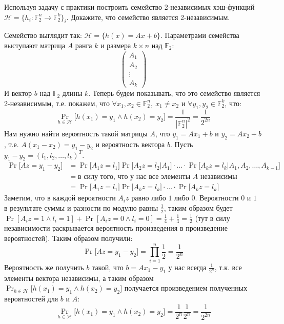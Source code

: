 \begin{task}[3]
Используя задачу с практики построить семейство 2-независимых хэш-функций $\mathcal{H} = \{ h_i: \mathbb{F}_2^n \rightarrow \mathbb{F}^k_2\}_i$. Докажите, что семейство является 2-независимым.
\end{task}
\begin{solution}
Семейство выглядит так: $\mathcal{H} = \{ h(x) = Ax + b \}$. Параметрами семейства выступают матрица $A$ ранга $k$ и размера $k \times n$  над $\mathbb{F}_2$: 
\[
	\begin{pmatrix}
		A_1 \\
		A_2 \\
		\vdots\\
		A_k
	\end{pmatrix}
\]
И вектор $b$ над $\mathbb{F}_2$ длины $k$. Теперь будем показывать, что это семейство является 2-независимым, т.е. покажем, что $\forall x_1, x_2 \in \mathbb{F}_2^n,\ x_1 \neq x_2$ и $\forall y_1, y_2 \in \mathbb{F}_2^k$, что:
\[
	\Pr_{h \in \mathcal{H}}\big[ h(x_1) = y_1 \wedge h(x_2) = y_2 \big] = \frac{1}{|\mathbb{F}_2^n|^2} = \frac{1}{2^{2n}}
\]
Нам нужно найти вероятность такой матрицы $A$, что $y_1 = Ax_1 + b$ и $y_2 = Ax_2 + b$, т.е. $A(x_1 - x_2) = y_1 - y_2$ и вероятность вектора $b$. Пусть $y_1 - y_2 = (l_1, l_2, \ldots, l_k)^T$.
\begin{equation*}
\begin{split}
\Pr\big[ Az = y_1 - y_2 \big] &= \Pr\big[ A_1z = l_1 \big] \Pr\big[ A_2z = l_2 | A_1 \big] \cdot \ldots  \cdot \Pr\big[ A_kz = l_k | A_1, A_2, \ldots, A_{k-1}] \\
&=\text{в силу того, что у нас все элементы $A$ независимы}\\
&= \Pr\big[ A_1z = l_1 \big] \Pr\big[ A_kz = l_k \big] \cdot \ldots \cdot \Pr\big[ A_kz = l_k \big]
\end{split}
\end{equation*}
Заметим, что в каждой вероятности $A_iz$ равно либо $1$ либо $0$. Вероятности $0$ и $1$ в результате суммы и разности по модулю равны $\frac{1}{2}$, таким образом будет $\Pr[A_iz = 1 \wedge l_i = 1] + \Pr[A_iz = 0 \wedge l_i = 0] = \frac{1}{4}+\frac{1}{4} = \frac{1}{2}$ (тут в силу независимости раскрывается вероятность произведения в произведение вероятностей). Таким образом получили: 
\[
	\Pr\big[ Az = y_1 - y_2 \big] = \prod_{i = 1}^n{\frac{1}{2}} = \frac{1}{2^n}
\]
Вероятность же получить $b$ такой, что $b = Ax_1 - y_1$ у нас всегда $\frac{1}{2^n}$, т.к. все элементы вектора независимы, а таким образом $\Pr_{h \in \mathcal{H}}\big[ h(x_1) = y_1 \wedge h(x_2) = y_2 \big]$ получается произведением полученных вероятностей для $b$ и $A$:
\[
 \Pr_{h \in \mathcal{H}}\big[ h(x_1) = y_1 \wedge h(x_2) = y_2 \big] = \frac{1}{2^n}\frac{1}{2^n} = \frac{1}{2^{2n}}
\]
\xqed
\end{solution}


